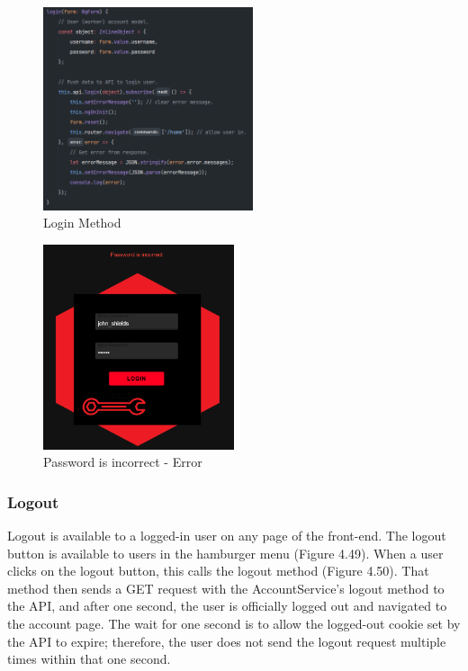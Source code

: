 \begin{figure}[H]
    \caption{Login Method}
    \label{image:loginMethod}
    \centering
    \includegraphics[width=0.55\textwidth]{images/repota/account_pages/login.png}
\end{figure}

\begin{figure}[H]
    \caption{Password is incorrect - Error}
    \label{image:failedLogin}
    \centering
    \includegraphics[width=0.5\textwidth]{images/repota/UI/failed-login.png}
\end{figure}

\subsubsection{Logout}
Logout is available to a logged-in user on any page of the front-end. The logout button is available to users in the hamburger menu (Figure 4.49). When a user clicks on the logout button, this calls the logout method (Figure 4.50). That method then sends a GET request with the AccountService's logout method to the API, and after one second, the user is officially logged out and navigated to the account page. The wait for one second is to allow the logged-out cookie set by the API to expire; therefore, the user does not send the logout request multiple times within that one second.

